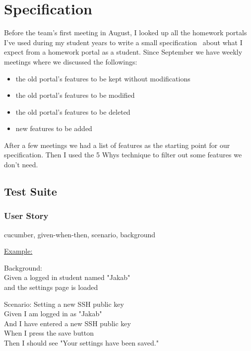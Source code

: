 \chapter{Specification}

Before the team's first meeting in August, I looked up all the homework portals I've used during my student years to write a small specification~\cite{Szepes-specification} about what I expect from a homework portal as a student. Since September we have weekly meetings where we discussed the followings: 

\begin{itemize}
	\item the old portal's features to be kept without modifications
	\item the old portal's features to be modified
	\item the old portal's features to be deleted
	\item new features to be added
\end{itemize}

After a few meetings we had a list of features as the starting point for our specification. Then I used the 5 Whys technique to filter out some features we don't need.

\section{Test Suite}
\subsection{User Story}
 cucumber, given-when-then, scenario, background

\underline{Example:}

Background:\\ \hspace*{1cm}
Given a logged in student named "Jakab"\\ \hspace*{1cm}
and the settings page is loaded

Scenario: Setting a new SSH public key\\ \hspace*{1cm}
Given I am logged in as "Jakab"\\ \hspace*{1cm}
And I have entered a new SSH public key\\ \hspace*{1cm}
When I press the save button\\ \hspace*{1cm}
Then I should see "Your settings have been saved."


